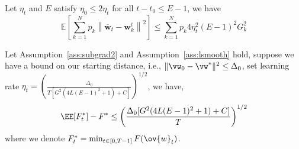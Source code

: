 \begin{lemma}
Let $\eta_t$ and $E$ satisfy $\eta_0 \leq 2 \eta_t$ for all $t- t_0 \leq E - 1$, we have
$$\mathbb{E}\left[\sum_{k=1}^{N} p_{k}\left\|\overline{\mathbf{w}}_{t}-\mathbf{w}_{k}^{t}\right\|^{2}\right] \leq \sum_{k=1}^N p_k4 \eta_{t}^{2}(E-1)^{2} G_k^{2}$$
\label{lma:l3iclr}
\end{lemma}

\begin{theorem}
Let Assumption~\ref{ass:subgrad2} and Assumption~\ref{ass:lsmooth} hold, suppose we have a bound 
on our starting distance, i.e., $\|\vw_{0} - \vw^*\|^2 \leq \Delta_0$, set learning rate $\eta_t =  \left(\frac{\Delta_0}{ T [G^2( 4L(E-1)^2 + 1) + C]}\right)^{1/2}$, we have,
$$\EE[ F_t^*] - F^*  \leq \left(\frac{ \Delta_0 [G^2( 4L(E-1)^2 + 1) + C] }{T}\right)^{1/2}$$
where we denote $F^*_t = \min_{t \in [0, T-1]} F(\ov{w}_t)$.
\end{theorem}
